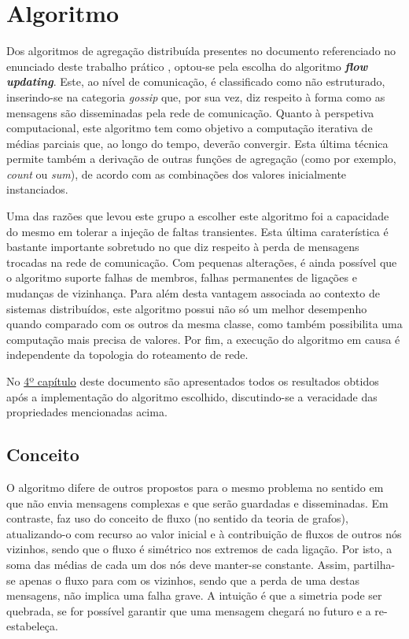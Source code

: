 \documentclass[a4paper]{article}
\begin{document}
\section{Algoritmo} \label{sec:Algorithm}
\large{
	Dos algoritmos de agregação distribuída presentes no documento referenciado no enunciado deste trabalho prático \parencite{article}, optou-se pela escolha do algoritmo \textbf{\textit{flow updating}}.
	Este, ao nível de comunicação, é classificado como não estruturado, inserindo-se na categoria \textit{gossip} que, por sua vez, diz respeito à forma como as mensagens são disseminadas pela rede de comunicação.
	Quanto à perspetiva computacional, este algoritmo tem como objetivo a computação iterativa de médias parciais que, ao longo do tempo, deverão convergir.
	Esta última técnica permite também a derivação de outras funções de agregação (como por exemplo, \textit{count} ou \textit{sum}), de acordo com as combinações dos valores inicialmente instanciados.

	Uma das razões que levou este grupo a escolher este algoritmo foi a capacidade do mesmo em tolerar a injeção de faltas transientes. 
	Esta última caraterística é bastante importante sobretudo no que diz respeito à perda de mensagens trocadas na rede de comunicação.
	Com pequenas alterações, é ainda possível que o algoritmo suporte falhas de membros, falhas permanentes de ligações e mudanças de vizinhança.
	Para além desta vantagem associada ao contexto de sistemas distribuídos, este algoritmo possui não só um melhor desempenho quando comparado com os outros da mesma classe, 
	como também possibilita uma computação mais precisa de valores.
	Por fim, a execução do algoritmo em causa é independente da topologia do roteamento de rede.

	No \hyperref[sec:Analysis of results]{4º capítulo} deste documento são apresentados todos os resultados obtidos após a implementação do algoritmo escolhido, discutindo-se a veracidade das propriedades mencionadas acima.

	\subsection{Conceito} \label{subsec:Concept}
	O algoritmo difere de outros propostos para o mesmo problema no sentido em que não envia mensagens complexas e que serão guardadas e disseminadas.
	Em contraste, faz uso do conceito de fluxo (no sentido da teoria de grafos), atualizando-o com recurso ao valor inicial e à contribuição de fluxos de outros nós vizinhos, 
	sendo que o fluxo é simétrico nos extremos de cada ligação. Por isto, a soma das médias de cada um dos nós deve manter-se constante.
	Assim, partilha-se apenas o fluxo para com os vizinhos, sendo que a perda de uma destas mensagens, não implica uma falha grave.
	A intuição é que a simetria pode ser quebrada, se for possível garantir que uma mensagem chegará no futuro e a re-estabeleça.

}
\end{document}
